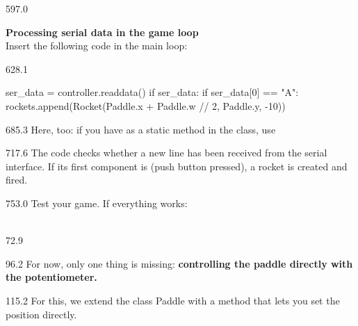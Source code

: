\documentclass{aslab}
\begin{document}
\begin{region}[pitch=13.3]{597.0}
\begin{tasks}[start=3]
\item \textbf{Processing serial data in the game loop}\\
  Insert the following code in the main loop:
\end{tasks}
\end{region}

\begin{region}[x=74.7,right=0,pitch=13.2]{628.1}
\begin{codeblock}
ser_data = controller.readdata()
if ser_data:
    if ser_data[0] == "A":
       rockets.append(Rocket(Paddle.x + Paddle.w // 2, Paddle.y, -10))
\end{codeblock}
\end{region}

\begin{region}[x=74.7,right=0,pitch=13.5]{685.3}
Here, too: if you have  as a static method in the class,
use\\
\end{region}

\begin{region}[x=74.7,right=0,pitch=13.4]{717.6}
The code checks whether a new line has been received from the serial
interface. If its first component is  (push button pressed), a
rocket is created and fired.
\end{region}

\begin{region}[pitch=13.3]{753.0}
Test your game. If everything works:\\
\\[-0.1bp]
\end{region}

\nextpage
\begin{region}{72.9}
\end{region}

\begin{region}{96.2}
For now, only one thing is missing: \textbf{controlling the paddle directly
with the potentiometer.}
\end{region}

\begin{region}[pitch=13.3]{115.2}
For this, we extend the class Paddle with a method  that lets
you set the  position directly.
\end{region}
\end{document}
